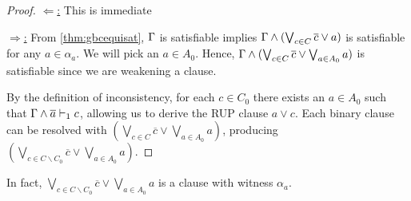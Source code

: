 \begin{proof}
    \underline{$\Leftarrow$:} This is immediate


    \underline{$\Rightarrow$:} From \autoref{thm:gbcequisat}, $\Gamma$ is
    satisfiable implies $\Gamma \land (\bigvee_{c \in C} \overline{c} \lor a)$
    is satisfiable for any $a \in \alpha_a$. We will pick an $a \in A_0$. Hence,
    $\Gamma \land (\bigvee_{c \in C} \overline{c} \lor \bigvee_{a \in A_0} a)$
    is satisfiable since we are weakening a clause.


    
    By the definition of inconsistency, for each $c \in C_0$ there exists an $a \in A_0$ such that $\Gamma \land \overline{a} \vdash_1 c$, 
    allowing us to derive the RUP clause  $a \lor c$. 
    Each binary clause can be resolved with $ (\bigvee_{c \in C}
    \overline{c} \lor \bigvee_{a \in A_0} a)$, producing  $(\bigvee_{c \in C \backslash C_0} \overline{c} \lor \bigvee_{a \in A_0} a)$. 
    

%
%
\end{proof}

In fact, $\bigvee_{c \in C \backslash C_0} \overline{c} \lor
\bigvee_{a \in A_0} a$ is a \pr clause with witness $\alpha_a$. 


